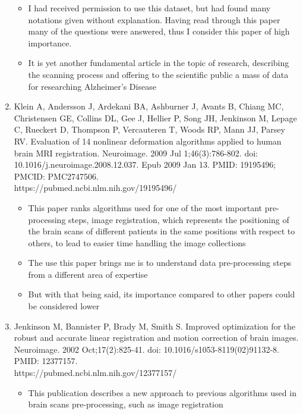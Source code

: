 \documentclass[a4paper]{article}
\begin{document}
\begin{enumerate}
\begin{itemize}
                  \item I had received permission to use this dataset, but had found many notations given without explanation. Having read
                        through this paper many of the questions were answered, thus I consider this paper of high importance.
                  \item It is yet another fundamental article in the topic of research, describing the scanning process and offering
                        to the scientific public a mass of data for researching Alzheimer's Disease
            \end{itemize}
      \item Klein A, Andersson J, Ardekani BA, Ashburner J, Avants B, Chiang MC, Christensen GE, Collins DL, Gee J, Hellier P, Song JH,
            Jenkinson M, Lepage C, Rueckert D, Thompson P, Vercauteren T, Woods RP, Mann JJ, Parsey RV. Evaluation of 14 nonlinear deformation
            algorithms applied to human brain MRI registration. Neuroimage. 2009 Jul 1;46(3):786-802. doi: 10.1016/j.neuroimage.2008.12.037.
            Epub 2009 Jan 13. PMID: 19195496; PMCID: PMC2747506. \\
            https://pubmed.ncbi.nlm.nih.gov/19195496/
            \begin{itemize}
                  \item This paper ranks algorithms used for one of the most important pre-processing steps, image registration,
                        which represents the positioning of the brain scans of different patients in the same positions with respect to others,
                        to lead to easier time handling the image collections
                  \item The use this paper brings me is to understand data pre-processing steps from a different area of expertise
                  \item But with that being said, its importance compared to other papers could be considered lower
            \end{itemize}
      \item Jenkinson M, Bannister P, Brady M, Smith S. Improved optimization for the robust and accurate linear registration and motion correction
            of brain images. Neuroimage. 2002 Oct;17(2):825-41. doi: 10.1016/s1053-8119(02)91132-8. PMID: 12377157. \\
            https://pubmed.ncbi.nlm.nih.gov/12377157/
            \begin{itemize}
                  \item This publication describes a new approach to previous algorithms used in brain scans pre-processing, such as image registration

\end{itemize}
\end{enumerate}
\end{document}
